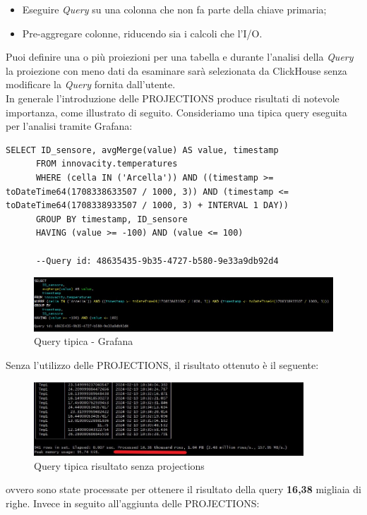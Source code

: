 \begin{itemize}
    \item Eseguire \textit{Query} su una colonna che non fa parte della chiave primaria;
    \item Pre-aggregare colonne, riducendo sia i calcoli che l'I/O.
\end{itemize}

Puoi definire una o più proiezioni per una tabella e durante l'analisi della \textit{Query} la proiezione con meno dati da esaminare sarà selezionata da ClickHouse senza modificare la \textit{Query} fornita dall'utente.
\\
In generale l'introduzione delle PROJECTIONS produce risultati di notevole importanza, come illustrato di seguito. Consideriamo una tipica query eseguita per l'analisi tramite Grafana:
    
    \begin{lstlisting}[caption={Query tipica - Grafana}, captionpos=b]
      SELECT ID_sensore, avgMerge(value) AS value, timestamp
      FROM innovacity.temperatures
      WHERE (cella IN ('Arcella')) AND ((timestamp >= toDateTime64(1708338633507 / 1000, 3)) AND (timestamp <= toDateTime64(1708338933507 / 1000, 3) + INTERVAL 1 DAY))
      GROUP BY timestamp, ID_sensore
      HAVING (value >= -100) AND (value <= 100)

      --Query id: 48635435-9b35-4727-b580-9e33a9db92d4
    \end{lstlisting}

    \begin{figure}[H]
        \centering
        \includegraphics[width=1\textwidth]{../Images/SpecificaTecnica/ProjectionQuery.jpg}
        \caption{Query tipica - Grafana}
        \label{fig:ProjectionsQuery}
      \end{figure}
      Senza l'utilizzo delle PROJECTIONS, il risultato ottenuto è il seguente:
    \begin{figure}[H]
        \centering
        \includegraphics[width=0.9\textwidth]{../Images/SpecificaTecnica/SenzaProectionResult.jpg}
        \caption{Query tipica risultato senza projections}
        \label{fig:ProjectionsQueryWthout}
      \end{figure}
      ovvero sono state processate per ottenere il risultato della query \textbf{16,38} migliaia di righe. Invece in seguito all’aggiunta delle PROJECTIONS:

